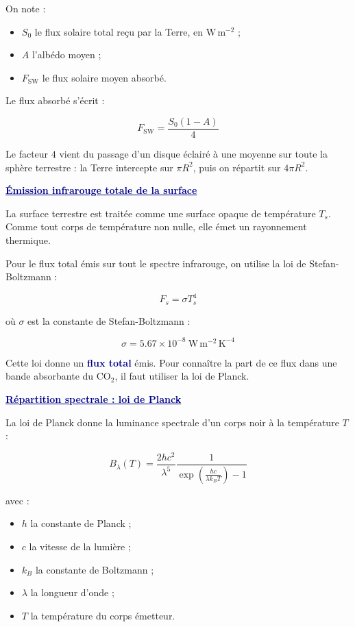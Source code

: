 \documentclass[11pt,a4paper]{article}
\newcommand{\COtwo}{CO$_2$}
\newcommand{\fluxunit}{\mathrm{W\,m^{-2}}}
\newcommand{\motcle}[1]{\textcolor{DarkBlue}{\textbf{#1}}}
\newcommand{\bloc}[1]{\vspace{0.9em}\noindent\textcolor{DarkBlue}{\underline{\textbf{#1}}}\par\vspace{0.35em}}
\begin{document}
On note :

\begin{itemize}
    \item $S_0$ le flux solaire total reçu par la Terre, en $\fluxunit$ ;
    \item $A$ l'albédo moyen ;
    \item $F_{\mathrm{SW}}$ le flux solaire moyen absorbé.
\end{itemize}

Le flux absorbé s'écrit :

\[
F_{\mathrm{SW}} = \frac{S_0(1-A)}{4}
\]

Le facteur $4$ vient du passage d'un disque éclairé à une moyenne sur toute la sphère terrestre : la Terre intercepte sur $\pi R^2$, puis on répartit sur $4\pi R^2$.

\bloc{Émission infrarouge totale de la surface}

La surface terrestre est traitée comme une surface opaque de température $T_s$. Comme tout corps de température non nulle, elle émet un rayonnement thermique.

Pour le flux total émis sur tout le spectre infrarouge, on utilise la loi de Stefan-Boltzmann :

\[
F_s = \sigma T_s^4
\]

où $\sigma$ est la constante de Stefan-Boltzmann :

\[
\sigma = 5.67\times10^{-8}\ \mathrm{W\,m^{-2}\,K^{-4}}
\]

Cette loi donne un \motcle{flux total} émis. Pour connaître la part de ce flux dans une bande absorbante du \COtwo{}, il faut utiliser la loi de Planck.

\bloc{Répartition spectrale : loi de Planck}

La loi de Planck donne la luminance spectrale d'un corps noir à la température $T$ :

\[
B_\lambda(T)
=
\frac{2hc^2}{\lambda^5}
\frac{1}{\exp\left(\frac{hc}{\lambda k_B T}\right)-1}
\]

avec :

\begin{itemize}
    \item $h$ la constante de Planck ;
    \item $c$ la vitesse de la lumière ;
    \item $k_B$ la constante de Boltzmann ;
    \item $\lambda$ la longueur d'onde ;
    \item $T$ la température du corps émetteur.
\end{itemize}
\end{document}
